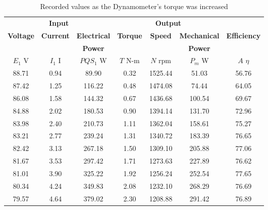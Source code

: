 \documentclass{article}
\begin{document}
\begin{table}[H]
  \centering
  \begin{tabular}{*{7}{c}}
    \multicolumn{3}{c}{\textbf{Input}} & \multicolumn{3}{c}{\textbf{Output}}
    & \\

    \textbf{Voltage} & \textbf{Current} & \textbf{Electrical} &
    \textbf{Torque}  & \textbf{Speed}   & \textbf{Mechanical} &
    \textbf{Efficiency} \\

    &                  & \textbf{Power}      &
    &                  & \textbf{Power}
    & \\

    $E_1$ V          & $I_1$ I          & $PQS_1$ W           &
    $T$ N-m          & $N$ rpm          & $P_{m}$ W           &
    $A$ $\eta$ \\

    \hline

    88.71 & 0.94 &  89.90 & 0.32 & 1525.44 &  51.03 & 56.76 \\
    87.42 & 1.25 & 116.22 & 0.48 & 1474.08 &  74.44 & 64.05 \\
    86.08 & 1.58 & 144.32 & 0.67 & 1436.68 & 100.54 & 69.67 \\
    84.88 & 2.02 & 180.53 & 0.90 & 1394.14 & 131.70 & 72.96 \\
    83.98 & 2.40 & 210.73 & 1.11 & 1362.04 & 158.61 & 75.27 \\
    83.21 & 2.77 & 239.24 & 1.31 & 1340.72 & 183.39 & 76.65 \\
    82.42 & 3.13 & 267.18 & 1.50 & 1309.10 & 205.88 & 77.06 \\
    81.67 & 3.53 & 297.42 & 1.71 & 1273.63 & 227.89 & 76.62 \\
    81.01 & 3.90 & 325.22 & 1.92 & 1256.24 & 252.54 & 77.65 \\
    80.34 & 4.24 & 349.83 & 2.08 & 1232.10 & 268.29 & 76.69 \\
    79.57 & 4.64 & 379.02 & 2.30 & 1208.88 & 291.42 & 76.89 \\
  \end{tabular}
  \caption{Recorded values as the Dynamometer's torque was increased}
  \label{tab:table_06}
\end{table}
\end{document}
